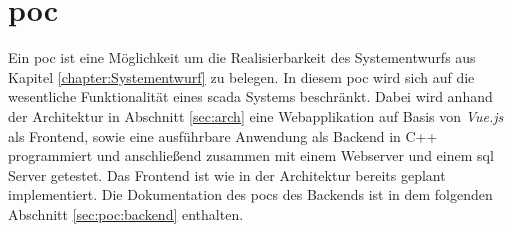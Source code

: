 \chapter{\acl{poc}}
Ein \ac{poc} ist eine Möglichkeit um die Realisierbarkeit des Systementwurfs aus Kapitel \ref{chapter:Systementwurf} zu belegen.
In diesem  \ac{poc} wird sich auf die wesentliche Funktionalität eines \ac{scada} Systems beschränkt.
Dabei wird anhand der Architektur in Abschnitt \ref{sec:arch} eine Webapplikation auf Basis von \emph{Vue.js} als Frontend, 
sowie eine ausführbare Anwendung als Backend in C++ programmiert und anschließend zusammen mit einem Webserver und einem \ac{sql} Server getestet.
Das Frontend ist wie in der Architektur bereits geplant implementiert. 
Die Dokumentation des \acp{poc} des Backends ist in dem folgenden Abschnitt \ref{sec:poc:backend} enthalten.


%